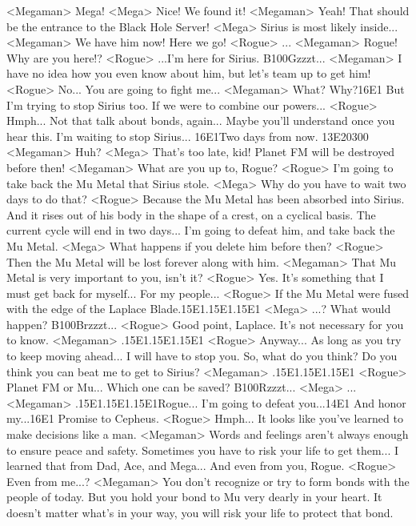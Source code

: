 <Megaman> Mega! 
<Mega> Nice! We found it! 
<Megaman> Yeah! That should be the entrance to the Black Hole Server! 
<Mega> Sirius is most likely inside... 
<Megaman> We have him now! 
Here we go! 
<Rogue> ... 
<Megaman> Rogue! Why are you here!? 
<Rogue> ...I'm here for Sirius. 
{B1}{00}Gzzzt... 
<Megaman> I have no idea how you even know about him, but let's team up to get him! 
<Rogue> No... 
You are going to fight me... 
<Megaman> What? Why?{16}{E1} But I'm trying to stop Sirius too. 
If we were to combine our powers... 
<Rogue> Hmph... Not that talk about bonds, again... 
Maybe you'll understand once you hear this. 
I'm waiting to stop Sirius... {16}{E1}Two days from now. 
{13}{E2}{03}{00} 
<Megaman> Huh? 
<Mega> That's too late, kid! Planet FM will be destroyed before then! 
<Megaman> What are you up to, Rogue? 
<Rogue> I'm going to take back the Mu Metal that Sirius stole. 
<Mega> Why do you have to wait two days to do that? 
<Rogue> Because the Mu Metal has been absorbed into Sirius. 
And it rises out of his body in the shape of a crest, on a cyclical basis. 
The current cycle will end in two days... 
I'm going to defeat him, and take back the Mu Metal. 
<Mega> What happens if you delete him before then? 
<Rogue> Then the Mu Metal will be lost forever along with him. 
<Megaman> That Mu Metal is very important to you, isn't it? 
<Rogue> Yes. It's something that I must get back for myself... 
For my people... 
<Rogue> If the Mu Metal were fused with the edge of the Laplace Blade.{15}{E1}.{15}{E1}.{15}{E1} 
<Mega> ...? What would happen? 
{B1}{00}Brzzzt... 
<Rogue> Good point, Laplace. 
It's not necessary for you to know. 
<Megaman> .{15}{E1}.{15}{E1}.{15}{E1} 
<Rogue> Anyway... As long as you try to keep moving ahead... 
I will have to stop you. 
So, what do you think? 
Do you think you can beat me to get to Sirius? 
<Megaman> .{15}{E1}.{15}{E1}.{15}{E1} 
<Rogue> Planet FM or Mu... Which one can be saved? 
{B1}{00}Rzzzt... 
<Mega> ... 
<Megaman> .{15}{E1}.{15}{E1}.{15}{E1}Rogue... 
I'm going to defeat you...{14}{E1} And honor my...{16}{E1} Promise to Cepheus. 
<Rogue> Hmph... 
It looks like you've learned to make decisions like a man. 
<Megaman> Words and feelings aren't always enough to ensure peace and safety. 
Sometimes you have to risk your life to get them... 
I learned that from Dad, Ace, and Mega... 
And even from you, Rogue. 
<Rogue> Even from me...? 
<Megaman> You don't recognize or try to form bonds with the people of today. 
But you hold your bond to Mu very dearly in your heart. 
It doesn't matter what's in your way, you will risk your life to protect that bond. 
